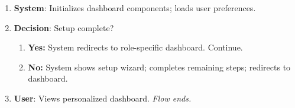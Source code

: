 \begin{enumerate}
\begin{enumerate}
    \end{enumerate}
  \item \textbf{System}: Initializes dashboard components; loads user preferences.
  \item \textbf{Decision}: Setup complete?
    \begin{enumerate}
        \item \textbf{Yes:} System redirects to role-specific dashboard. Continue.
        \item \textbf{No:} System shows setup wizard; completes remaining steps; redirects to dashboard.
    \end{enumerate}
  \item \textbf{User}: Views personalized dashboard. \textit{Flow ends.}
\end{enumerate}